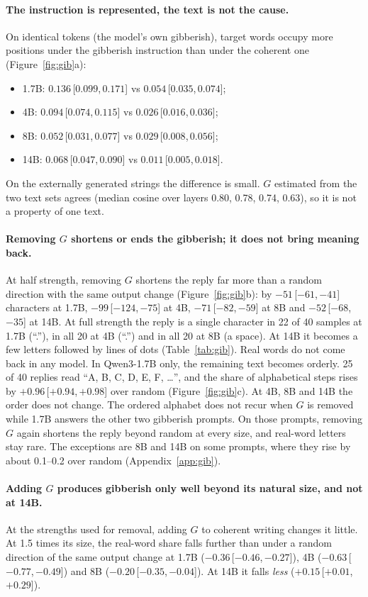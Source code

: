 \documentclass[11pt]{article}
\newcommand{\ci}[3]{\ensuremath{#1}\,[\ensuremath{#2},\allowbreak\,\ensuremath{#3}]}
\begin{document}
\paragraph{The instruction is represented, the text is not the cause.} On identical tokens (the model's own gibberish), target words occupy more positions under the gibberish instruction than under the coherent one (Figure~\ref{fig:gib}a):
\begin{itemize}
  \item 1.7B: \ci{0.136}{0.099}{0.171} vs \ci{0.054}{0.035}{0.074};
  \item 4B: \ci{0.094}{0.074}{0.115} vs \ci{0.026}{0.016}{0.036};
  \item 8B: \ci{0.052}{0.031}{0.077} vs \ci{0.029}{0.008}{0.056};
  \item 14B: \ci{0.068}{0.047}{0.090} vs \ci{0.011}{0.005}{0.018}.
\end{itemize}
On the externally generated strings the difference is small. $G$ estimated from the two text sets agrees (median cosine over layers 0.80, 0.78, 0.74, 0.63), so it is not a property of one text.

\paragraph{Removing $G$ shortens or ends the gibberish; it does not bring meaning back.} At half strength, removing $G$ shortens the reply far more than a random direction with the same output change (Figure~\ref{fig:gib}b): by \ci{-51}{-61}{-41} characters at 1.7B, \ci{-99}{-124}{-75} at 4B, \ci{-71}{-82}{-59} at 8B and \ci{-52}{-68}{-35} at 14B. At full strength the reply is a single character in 22 of 40 samples at 1.7B (``.''), in all 20 at 4B (``.'') and in all 20 at 8B (a space). At 14B it becomes a few letters followed by lines of dots (Table~\ref{tab:gib}). Real words do not come back in any model. In Qwen3-1.7B only, the remaining text becomes orderly. 25 of 40 replies read ``A, B, C, D, E, F, \dots'', and the share of alphabetical steps rises by \ci{+0.96}{+0.94}{+0.98} over random (Figure~\ref{fig:gib}c). At 4B, 8B and 14B the order does not change. The ordered alphabet does not recur when $G$ is removed while 1.7B answers the other two gibberish prompts. On those prompts, removing $G$ again shortens the reply beyond random at every size, and real-word letters stay rare. The exceptions are 8B and 14B on some prompts, where they rise by about 0.1--0.2 over random (Appendix~\ref{app:gib}).

\paragraph{Adding $G$ produces gibberish only well beyond its natural size, and not at 14B.} At the strengths used for removal, adding $G$ to coherent writing changes it little. At 1.5 times its size, the real-word share falls further than under a random direction of the same output change at 1.7B (\ci{-0.36}{-0.46}{-0.27}), 4B (\ci{-0.63}{-0.77}{-0.49}) and 8B (\ci{-0.20}{-0.35}{-0.04}). At 14B it falls \emph{less} (\ci{+0.15}{+0.01}{+0.29}).
\end{document}
